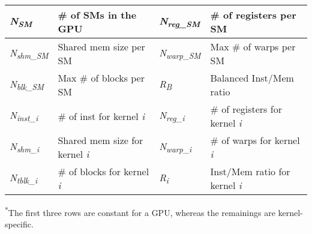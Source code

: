 \documentclass[twocolumn]{el-author}
\begin{document}
\begin{table}[b]
	\centering
	{\begin{tabular}{l|l|l|l}
		\hline 
		\emph{N\textsubscript{SM}} & \# of SMs in the GPU & \emph{N\textsubscript{reg\_SM}} & \# of registers per SM \\
		\hline
		\emph{N\textsubscript{shm\_SM}} & Shared mem size per SM & \emph{N\textsubscript{warp\_SM}} & Max \# of warps per SM \\
		\hline
		\emph{N\textsubscript{blk\_SM}} & Max \# of blocks per SM & \emph{R\textsubscript{B}} & Balanced Inst/Mem ratio\\
		\hline
		\hline
		\emph{N\textsubscript{inst\_i}} & \# of inst for kernel \emph{i}& \emph{N\textsubscript{reg\_i}} & \# of registers for kernel \emph{i}  \\
		\hline
		\emph{N\textsubscript{shm\_i}} & Shared mem size for kernel \emph{i} & \emph{N\textsubscript{warp\_i}} & \# of warps for kernel \emph{i}\\
		\hline
		 \emph{N\textsubscript{tblk\_i}} & \# of blocks for kernel \emph{i} & \emph{R\textsubscript{i}} & Inst/Mem ratio for kernel \emph{i}\\
		\hline

	\end{tabular}}{\scriptsize \textsuperscript{*}The first three rows are constant for a GPU, whereas the remainings are kernel-specific.}
\end{table} 
\end{document}
